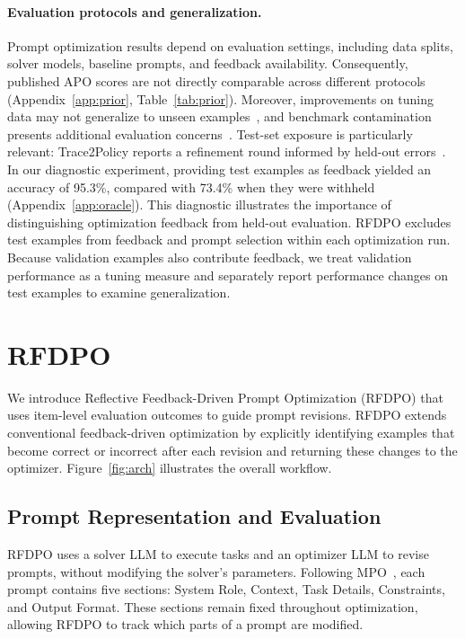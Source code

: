\documentclass[11pt]{article}
\begin{document}
\paragraph{Evaluation protocols and generalization.}
Prompt optimization results depend on evaluation settings, including data splits, solver models, baseline prompts, and feedback availability. Consequently, published APO scores are not directly comparable across different protocols (Appendix~\ref{app:prior}, Table~\ref{tab:prior}). Moreover, improvements on tuning data may not generalize to unseen examples~\citep{recht2019imagenet}, and benchmark contamination presents additional evaluation concerns~\citep{oren2023proving}. Test-set exposure is particularly relevant: Trace2Policy reports a refinement round informed by held-out errors~\citep{zha2026trace2policy}. In our diagnostic experiment, providing test examples as feedback yielded an accuracy of 95.3\%, compared with 73.4\% when they were withheld (Appendix~\ref{app:oracle}). This diagnostic illustrates the importance of distinguishing optimization feedback from held-out evaluation. RFDPO excludes test examples from feedback and prompt selection within each optimization run. Because validation examples also contribute feedback, we treat validation performance as a tuning measure and separately report performance changes on test examples to examine generalization.



\section{RFDPO}
\label{sec:method}

We introduce Reflective Feedback-Driven Prompt Optimization (RFDPO) that uses item-level evaluation outcomes to guide prompt revisions. RFDPO extends conventional feedback-driven optimization by explicitly identifying examples that become correct or incorrect after each revision and returning these changes to the optimizer. Figure~\ref{fig:arch} illustrates the overall workflow.

\subsection{Prompt Representation and Evaluation}

RFDPO uses a solver LLM to execute tasks and an optimizer LLM to revise prompts, without modifying the solver's parameters. Following MPO~\citep{sharma2026mpo}, each prompt contains five sections: System Role, Context, Task Details, Constraints, and Output Format. These sections remain fixed throughout optimization, allowing RFDPO to track which parts of a prompt are modified.
\end{document}
